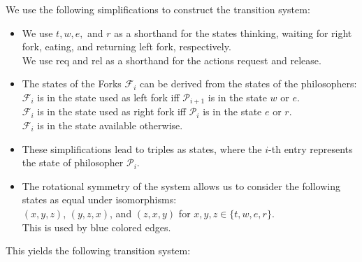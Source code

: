 \documentclass[11pt]{article}
\begin{document}
	We use the following simplifications to construct the transition system:
	\begin{itemize}
		\item We use $t, w, e,$ and $r$ as a shorthand for the states thinking, waiting for right fork, eating, and returning left fork, respectively.\\
		We use req and rel as a shorthand for the actions request and release.
		
		\item The states of the Forks $\mathcal{F}_i$ can be derived from the states of the philosophers:\\
		$\mathcal{F}_i$ is in the state used as left fork iff $\mathcal{P}_{i+1}$ is in the state $w$ or $e$.\\
		$\mathcal{F}_i$ is in the state used as right fork iff $\mathcal{P}_{i}$ is in the state $e$ or $r$.\\
		$\mathcal{F}_i$ is in the state available otherwise.
		
		\item These simplifications lead to triples as states, where the $i$-th entry represents the state of philosopher $\mathcal{P}_i$.
		
		\item The rotational symmetry of the system allows us to consider the following states as equal under isomorphisms:\\
		$(x, y, z)$, $(y, z, x)$, and $(z, x, y)$ for $x,y,z \in \{t,w,e,r\}$.\\
		This is used by blue colored edges.
	\end{itemize}
	
	This yields the following transition system:
	
\end{document}
